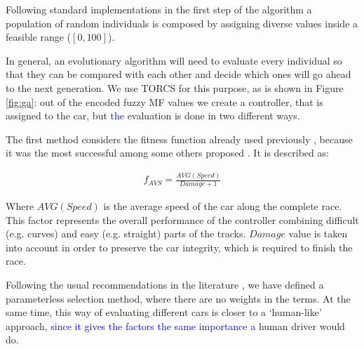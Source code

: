 \documentclass[10pt,journal,compsoc]{IEEEtran}
\begin{document}



Following standard implementations in the first step of the algorithm \cite{salem_evo18} a
population of random individuals is composed by assigning diverse values inside a feasible range ($[0,100]$).

In general, an evolutionary algorithm will need to evaluate every
individual so that they can be compared with each other and decide
which ones will go ahead to the next generation. We use TORCS for this
purpose, as is shown in Figure \ref{fig:ga}: out of the encoded fuzzy
MF values we create a controller, that is assigned to the car, but
\textcolor{blue}{the} evaluation is done in two different ways.

The first method considers the fitness function already used
previously \cite{salem_cig2018}, because it was the most successful 
among some others proposed \cite{salem_evo18}. It is described as: 

 \begin{equation} \label{fit_avg}
 	\begin{array}{lll}
 		f_{AVS}= \frac{AVG(Speed)}{Damage+1}
 	\end{array}
 \end{equation}	

Where $AVG(Speed)$ is the average speed of the car along the complete
race. This factor represents the overall performance of the controller
combining difficult (e.g. curves) and easy (e.g. straight) parts of
the tracks. $Damage$ value is taken into account in order to preserve
the car integrity, which is required to finish the race. 

Following the usual recommendations in the literature
\cite{Harik-ParameterLess99}, we have defined a parameterless
selection method, where there are no weights in the terms.  At the
same time, this way of evaluating different cars is closer to a
`human-like' approach, \textcolor{blue}{since it gives the factors the same importance
a} human driver would do.
\end{document}

